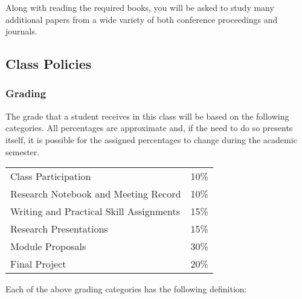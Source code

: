 Along with reading the required books, you will be asked to study many additional papers from a wide variety of both
conference proceedings and journals.

\subsection*{Class Policies}

\subsubsection*{Grading}

The grade that a student receives in this class will be based on the following categories. All percentages are
approximate and, if the need to do so presents itself, it is possible for the assigned percentages to change during the
academic semester. 


\begin{center}
\begin{tabular}{ll}
Class Participation&10\%\\
Research Notebook and Meeting Record&10\%\\
Writing and Practical Skill Assignments&15\%\\
Research Presentations&15\%\\
Module Proposals&30\%\\
Final Project&20\%
\end{tabular}
\end{center}

Each of the above grading categories has the following definition:

